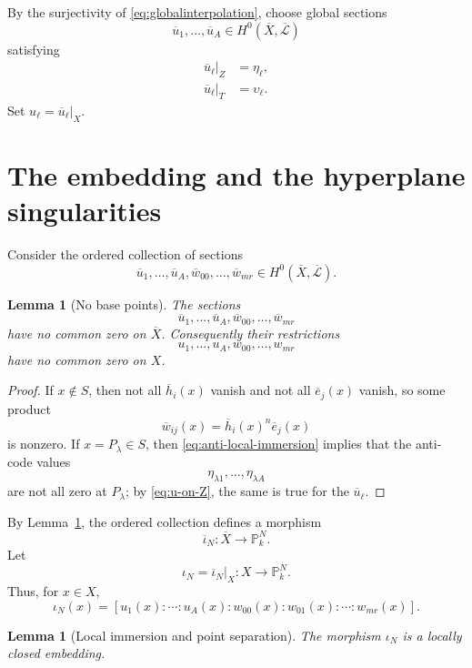 \documentclass{lms}
\newtheorem{lemma}[theorem]{Lemma}
\newcommand{\PP}{\mathbb P}
\newcommand{\LL}{\mathcal L}
\newcommand{\barX}{\overline{X}}
\begin{document}
By the surjectivity of \eqref{eq:globalinterpolation}, choose global sections
\[
        \overline u_1,\ldots,\overline u_A\in H^0(\barX,\overline{\LL})
\]
satisfying
\begin{align}
        \overline u_\ell|_Z&=\eta_\ell,                                  \label{eq:u-on-Z}\\
        \overline u_\ell|_T&=\upsilon_\ell.                              \label{eq:u-on-T}
\end{align}
Set $u_\ell=\overline u_\ell|_X$.

\section{The embedding and the hyperplane singularities}\label{sec:embedding}

Consider the ordered collection of sections
\[
        \overline u_1,\ldots,\overline u_A,
        \overline w_{00},\ldots,\overline w_{mr}
        \in H^0(\barX,\overline{\LL}).
\]

\begin{lemma}[No base points]\label{lem:basepoint}
The sections
\[
        \overline u_1,\ldots,\overline u_A,
        \overline w_{00},\ldots,\overline w_{mr}
\]
have no common zero on $\barX$.  Consequently their restrictions
\[
        u_1,\ldots,u_A,
        w_{00},\ldots,w_{mr}
\]
have no common zero on $X$.
\end{lemma}

\begin{proof}
If $x\notin S$, then not all $\overline h_i(x)$ vanish and not all $\overline e_j(x)$ vanish, so some product
\[
        \overline w_{ij}(x)=\overline h_i(x)^n\overline e_j(x)
\]
is nonzero.  If $x=P_\lambda\in S$, then \eqref{eq:anti-local-immersion} implies that the anti-code values
\[
        \eta_{\lambda1},\ldots,\eta_{\lambda A}
\]
are not all zero at $P_\lambda$; by \eqref{eq:u-on-Z}, the same is true for the $\overline u_\ell$.
\end{proof}

By Lemma~\ref{lem:basepoint}, the ordered collection defines a morphism
\[
        \overline\iota_N:\barX\longrightarrow\PP^N_k.
\]
Let
\[
        \iota_N=\overline\iota_N|_X:X\longrightarrow\PP^N_k.
\]
Thus, for $x\in X$,
\begin{equation}\label{eq:iota}
        \iota_N(x)=
        [u_1(x):\cdots:u_A(x):w_{00}(x):w_{01}(x):\cdots:w_{mr}(x)].
\end{equation}

\begin{lemma}[Local immersion and point separation]\label{lem:embedding}
The morphism $\iota_N$ is a locally closed embedding.
\end{lemma}
\end{document}
